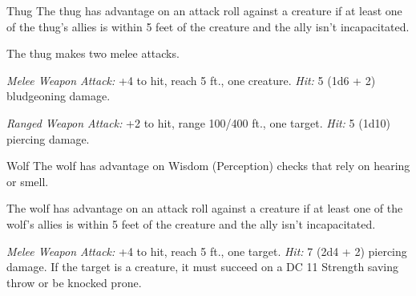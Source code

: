 \documentclass[10pt,a4paper,twoside,bg=print,twocolumn,openany,nodeprecatedcode]{dndbook}
\begin{document}
\begin{DndMonster}[float=t]{Thug}
\DndMonsterBasics[
armor-class = {11 (\textit{leather armor})},
hit-points = {\DndDice{5d8 + 10}},
speed = {30 ft.}
]
\DndMonsterAbilityScores[
 str = 15,
 dex = 11,
 con = 14,
 int = 10,
 wis = 10,
 cha = 11
]
\DndMonsterDetails[
skills = {Intimidation +2},
languages = {any one language (usually Common)},
challenge = 1/2,
]
The thug has advantage on an attack roll against a creature if at least one of the thug's allies is within 5 feet of the creature and the ally isn't incapacitated.

\par
{}
The thug makes two melee attacks.

\textsl{Melee Weapon Attack:} +4 to hit, reach 5 ft., one creature. \textsl{Hit:} 5 (1d6 + 2) bludgeoning damage.

\textsl{Ranged Weapon Attack:} +2 to hit, range 100/400 ft., one target. \textsl{Hit:} 5 (1d10) piercing damage.

\end{DndMonster}



\begin{DndMonster}[float=t]{Wolf}
\DndMonsterBasics[
armor-class = {13 (natural armor)},
hit-points = {\DndDice{2d8 + 2}},
speed = {40 ft.}
]
\DndMonsterAbilityScores[
 str = 12,
 dex = 15,
 con = 12,
 int = 3,
 wis = 12,
 cha = 6
]
\DndMonsterDetails[
skills = {Perception +3, Stealth +4},
challenge = 1/4,
]
The wolf has advantage on Wisdom (Perception) checks that rely on hearing or smell.

The wolf has advantage on an attack roll against a creature if at least one of the wolf's allies is within 5 feet of the creature and the ally isn't incapacitated.

\par
{}
\textsl{Melee Weapon Attack:} +4 to hit, reach 5 ft., one target. \textsl{Hit:} 7 (2d4 + 2) piercing damage. If the target is a creature, it must succeed on a DC 11 Strength saving throw or be knocked prone.

\end{DndMonster}
\end{document}
